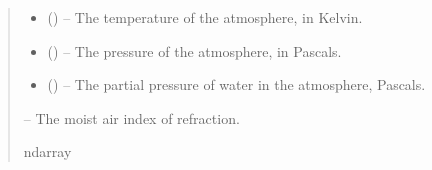 \documentclass[letterpaper,11pt,english]{sphinxmanual}
\begin{document}
\begin{savenotes}
\begin{fulllineitems}
\begin{quote}
\begin{description}
\begin{itemize}
\item {} 
\sphinxAtStartPar
{} () – The temperature of the atmosphere, in Kelvin.

\item {} 
\sphinxAtStartPar
{} () – The pressure of the atmosphere, in Pascals.

\item {} 
\sphinxAtStartPar
{} () – The partial pressure of water in the atmosphere, Pascals.

\end{itemize}

\sphinxAtStartPar
{} – The moist air index of refraction.

\sphinxAtStartPar
ndarray

\end{description}\end{quote}

\end{fulllineitems}\end{savenotes}

\end{document}
